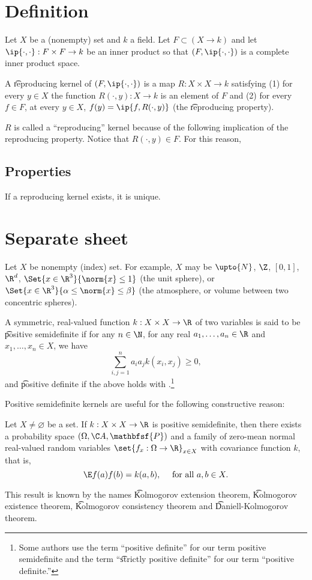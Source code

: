 
  \section*{Definition}

Let $X$ be a (nonempty) set and $k$ a field.
Let $F \subset (X \to k)$ and let $\ip{\cdot , \cdot }: F \times F \to k$ be an inner product so that $(F, \ip{\cdot ,\cdot })$ is a complete inner product space.

A \t{reproducing kernel} of $(F, \ip{\cdot ,\cdot })$ is a map $R: X \times X \to k$ satisfying (1) for every $y \in X$ the function $R(\cdot , y): X \to k$ is an element of $F$ and (2) for every $f \in F$, at every $y \in X$, $f(y) = \ip{f, R(\cdot , y)}$ (the \t{reproducing property}).

$R$ is called a ``reproducing'' kernel because of the following implication of the reproducing property.
Notice that $R(\cdot , y) \in F$.
For this reason,

\subsection*{Properties}

If a reproducing kernel exists, it is unique.

\section*{Separate sheet}

Let $X$ be nonempty (index) set.
For example, $X$ may be $\upto{N}$, $\Z $, $[0, 1]$, $\R ^d$, $\Set{x \in \R ^3}{\norm{x} \leq 1}$ (the unit sphere), or $\Set{x \in \R ^3}{\alpha  \leq \norm{x} \leq \beta }$ (the atmosphere, or volume between two concentric spheres).

A symmetric, real-valued function $k: X \times X \to \R $ of two variables is said to be \t{positive semidefinite} if for any $n \in \N  $, for any real $a_1, \dots , a_n \in \R $ and $x_1, \dots , x_n \in X$, we have
\[
\sum_{i, j = 1}^{n} a_ia_j k(x_i, x_j) \geq 0,
\]
and \t{positive definite} if the above holds with \say{$>$}.\footnote{Some authors use the term ``positive definite'' for our term positive semidefinite and the term ``\t{strictly positive definite}'' for our term ``positive definite.''}

Positive semidefinite kernels are useful for the following constructive reason:

\begin{proposition}
Let $X \neq \varnothing$ be a set.
If $k: X \times X \to \R $ is positive semidefinite, then there exists a probability space $(\Omega , \C A, \mathbfsf{P} )$ and a family of zero-mean normal real-valued random variables $\set{f_x: \Omega  \to \R }_{x \in X}$ with covariance function $k$, that is,
\[
\E  f(a)f(b) = k(a, b), \quad \text{ for all } a, b \in X.
\]
\end{proposition}

This result is known by the names \t{Kolmogorov extension theorem}, \t{Kolmogorov existence theorem}, \t{Kolmogorov consistency theorem} and \t{Daniell-Kolmogorov theorem}.
\blankpage